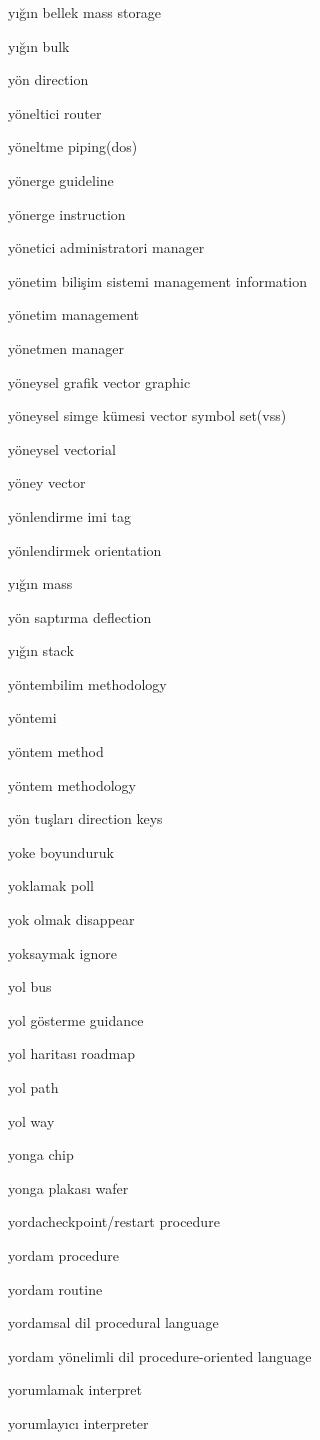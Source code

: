 \documentclass[12pt,fleqn]{article}\usepackage{../../common}
\begin{document}
yığın bellek mass storage

yığın bulk

yön direction

yöneltici router

yöneltme piping(dos)

yönerge guideline

yönerge instruction

yönetici administratori manager

yönetim bilişim sistemi management information

yönetim management

yönetmen manager

yöneysel grafik vector graphic

yöneysel simge kümesi vector symbol set(vss)

yöneysel vectorial

yöney vector

yönlendirme imi tag

yönlendirmek orientation

yığın mass

yön saptırma deflection

yığın stack

yöntembilim methodology

yöntemi

yöntem method

yöntem methodology

yön tuşları direction keys

yoke boyunduruk

yoklamak poll

yok olmak disappear

yoksaymak ignore

yol bus

yol gösterme guidance

yol haritası roadmap

yol path

yol way

yonga chip

yonga plakası wafer

yordacheckpoint/restart procedure

yordam procedure

yordam routine

yordamsal dil procedural language

yordam yönelimli dil procedure-oriented language

yorumlamak interpret

yorumlayıcı interpreter
\end{document}
